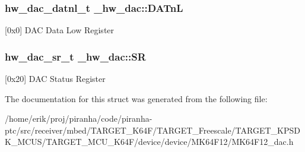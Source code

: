 \subsubsection[{\texorpdfstring{D\+A\+TnL}{DATnL}}]{ {\bf hw\+\_\+dac\+\_\+datnl\+\_\+t} \+\_\+hw\+\_\+dac\+::\+D\+A\+TnL}\hypertarget{struct__hw__dac_a453ec3e79381cff97e0cf8d8bb9c912b}{}\label{struct__hw__dac_a453ec3e79381cff97e0cf8d8bb9c912b}
\mbox{[}0x0\mbox{]} D\+AC Data Low Register 
\subsubsection[{\texorpdfstring{SR}{SR}}]{ {\bf hw\+\_\+dac\+\_\+sr\+\_\+t} \+\_\+hw\+\_\+dac\+::\+SR}\hypertarget{struct__hw__dac_a0320f3455f922d2d918163a0a750b60d}{}\label{struct__hw__dac_a0320f3455f922d2d918163a0a750b60d}
\mbox{[}0x20\mbox{]} D\+AC Status Register 

The documentation for this struct was generated from the following file\+:\begin{DoxyCompactItemize}
\item 
/home/erik/proj/piranha/code/piranha-\/ptc/src/receiver/mbed/\+T\+A\+R\+G\+E\+T\+\_\+\+K64\+F/\+T\+A\+R\+G\+E\+T\+\_\+\+Freescale/\+T\+A\+R\+G\+E\+T\+\_\+\+K\+P\+S\+D\+K\+\_\+\+M\+C\+U\+S/\+T\+A\+R\+G\+E\+T\+\_\+\+M\+C\+U\+\_\+\+K64\+F/device/device/\+M\+K64\+F12/M\+K64\+F12\+\_\+dac.\+h\end{DoxyCompactItemize}
